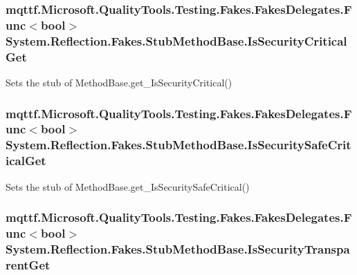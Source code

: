 \hypertarget{class_system_1_1_reflection_1_1_fakes_1_1_stub_method_base_a45d83070c51d7f26e3834273b35fccf7}{
\subsubsection[{Is\-Security\-Critical\-Get}]{\setlength{\rightskip}{0pt plus 5cm}mqttf.\-Microsoft.\-Quality\-Tools.\-Testing.\-Fakes.\-Fakes\-Delegates.\-Func$<$bool$>$ System.\-Reflection.\-Fakes.\-Stub\-Method\-Base.\-Is\-Security\-Critical\-Get}}\label{class_system_1_1_reflection_1_1_fakes_1_1_stub_method_base_a45d83070c51d7f26e3834273b35fccf7}


Sets the stub of Method\-Base.\-get\-\_\-\-Is\-Security\-Critical()

\hypertarget{class_system_1_1_reflection_1_1_fakes_1_1_stub_method_base_abed9eae85aa84e74831729f07880f02c}{
\subsubsection[{Is\-Security\-Safe\-Critical\-Get}]{\setlength{\rightskip}{0pt plus 5cm}mqttf.\-Microsoft.\-Quality\-Tools.\-Testing.\-Fakes.\-Fakes\-Delegates.\-Func$<$bool$>$ System.\-Reflection.\-Fakes.\-Stub\-Method\-Base.\-Is\-Security\-Safe\-Critical\-Get}}\label{class_system_1_1_reflection_1_1_fakes_1_1_stub_method_base_abed9eae85aa84e74831729f07880f02c}


Sets the stub of Method\-Base.\-get\-\_\-\-Is\-Security\-Safe\-Critical()

\hypertarget{class_system_1_1_reflection_1_1_fakes_1_1_stub_method_base_aa6285b38b24551f3e72a61b0f9ebaaab}{
\subsubsection[{Is\-Security\-Transparent\-Get}]{\setlength{\rightskip}{0pt plus 5cm}mqttf.\-Microsoft.\-Quality\-Tools.\-Testing.\-Fakes.\-Fakes\-Delegates.\-Func$<$bool$>$ System.\-Reflection.\-Fakes.\-Stub\-Method\-Base.\-Is\-Security\-Transparent\-Get}}\label{class_system_1_1_reflection_1_1_fakes_1_1_stub_method_base_aa6285b38b24551f3e72a61b0f9ebaaab}


